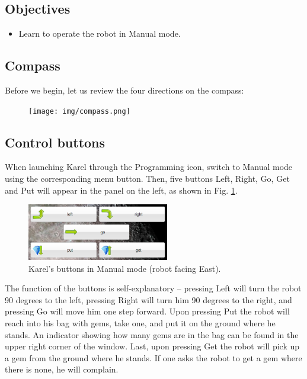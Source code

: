 \subsection{Objectives} 
\begin{itemize}
\item Learn to operate the robot in Manual mode.
\end{itemize}

\subsection{Compass}

Before we begin, let us review the four directions on the compass:\\[-7mm]

\begin{figure}[!ht]
\begin{center}
\texttt{[image: img/compass.png]}
\vspace{-0mm}
\end{center}
\vspace{-1cm}
\end{figure}

\subsection{Control buttons}

When launching Karel through the Programming icon, switch to Manual mode using the corresponding 
menu button. Then, five buttons Left, Right, Go, Get and Put will appear in the panel on the left,
as shown in Fig. \ref{fig:buttons}.

\begin{figure}[!ht]
\begin{center}
\includegraphics[width=6.2cm]{img/buttons-all.png}
\vspace{-0mm}
\caption{Karel's buttons in Manual mode (robot facing East).}
\label{fig:buttons}
\end{center}
\end{figure}
\noindent
The function of the buttons is self-explanatory -- pressing Left will turn the robot 90 degrees to the left,
pressing Right will turn him 90 degrees to the right, and pressing Go will move him one step forward. 
Upon pressing Put the robot will reach into his bag with gems, 
take one, and put it on the ground where he stands. 
An indicator showing how many gems are in the bag can be found in the upper right 
corner of the window. Last, upon pressing 
Get the robot will pick up a gem from the ground where he stands. If 
one asks the robot to get a gem where there is none, he will complain.

